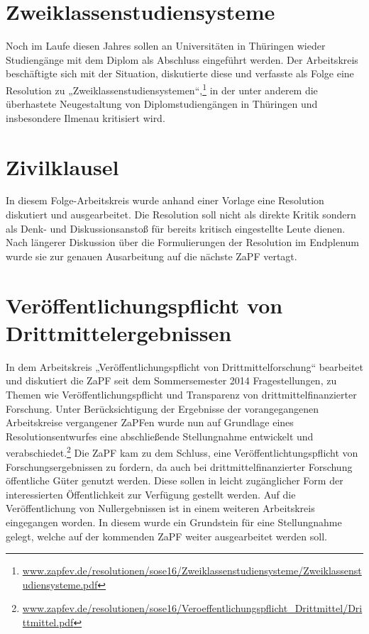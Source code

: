 \section*{Zweiklassenstudiensysteme}
Noch im Laufe diesen Jahres sollen an Universitäten in Thüringen wieder Studiengänge mit 
dem Diplom als Abschluss eingeführt werden. Der Arbeitskreis beschäftigte sich mit der Situation,
diskutierte diese und verfasste als Folge eine Resolution zu „Zweiklassenstudiensystemen“,\footnote{\href{http://www.zapfev.de/resolutionen/sose16/Zweiklassenstudiensysteme/Zweiklassenstudiensysteme.pdf}{\url{www.zapfev.de/resolutionen/sose16/Zweiklassenstudiensysteme/Zweiklassenstudiensysteme.pdf}}} 
in der unter anderem die überhastete Neugestaltung von Diplomstudiengängen in Thüringen und insbesondere Ilmenau kritisiert wird.

\section*{Zivilklausel}
In diesem Folge-Arbeitskreis wurde anhand einer Vorlage eine Resolution diskutiert und
ausgearbeitet. Die Resolution soll nicht als direkte Kritik sondern als Denk- und Diskussionsanstoß 
für bereits kritisch eingestellte Leute dienen. Nach längerer Diskussion über die Formulierungen der Resolution 
im Endplenum wurde sie zur genauen Ausarbeitung auf die nächste ZaPF vertagt.

\section*{Veröffentlichungspflicht von Drittmittelergebnissen}
In dem Arbeitskreis „Veröffentlichungspflicht von Drittmittelforschung“ bearbeitet 
und diskutiert die ZaPF seit dem Sommersemester 2014 Fragestellungen, zu Themen wie 
Veröffentlichungspflicht und Transparenz von drittmittelfinanzierter Forschung. 
Unter Berücksichtigung der Ergebnisse der vorangegangenen Arbeitskreise vergangener 
ZaPFen wurde nun auf Grundlage eines Resolutionsentwurfes eine abschließende Stellungnahme 
entwickelt und verabschiedet.\footnote{\href{http://www.zapfev.de/resolutionen/sose16/Veroeffentlichungspflicht_Drittmittel/Drittmittel.pdf}{\url{www.zapfev.de/resolutionen/sose16/Veroeffentlichungspflicht_Drittmittel/Drittmittel.pdf}}}
Die ZaPF kam zu dem Schluss, eine Veröffentlichtungspflicht von Forschungsergebnissen zu fordern, 
da auch bei drittmittelfinanzierter Forschung öffentliche Güter genutzt werden. Diese sollen in leicht zugänglicher Form der interessierten Öffentlichkeit zur Verfügung gestellt werden. Auf die Veröffentlichung von Nullergebnissen ist in einem weiteren 
Arbeitskreis eingegangen worden. In diesem wurde ein Grundstein für eine Stellungnahme gelegt, 
welche auf der kommenden ZaPF weiter ausgearbeitet werden soll.

